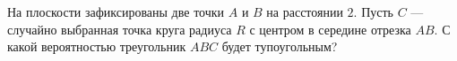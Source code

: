 \documentclass{article}
\begin{document}
На плоскости зафиксированы две точки $A$ и $B$ на расстоянии $2$. Пусть $C$ --- случайно выбранная точка круга радиуса $R$ с центром в 
середине отрезка $AB$. С какой вероятностью треугольник $ABC$ будет тупоугольным?
\end{document}
